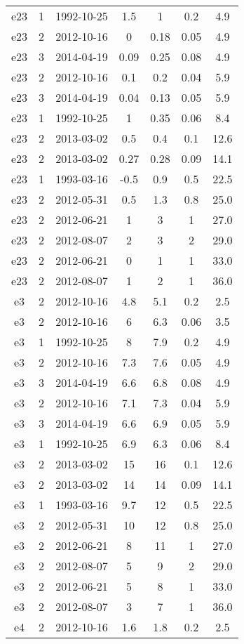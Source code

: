 \begin{longtable}{ccccccc}
e23 & 1 & 1992-10-25 & 1.5 & 1 & 0.2 & 4.9 \\
e23 & 2 & 2012-10-16 & 0 & 0.18 & 0.05 & 4.9 \\
e23 & 3 & 2014-04-19 & 0.09 & 0.25 & 0.08 & 4.9 \\
e23 & 2 & 2012-10-16 & 0.1 & 0.2 & 0.04 & 5.9 \\
e23 & 3 & 2014-04-19 & 0.04 & 0.13 & 0.05 & 5.9 \\
e23 & 1 & 1992-10-25 & 1 & 0.35 & 0.06 & 8.4 \\
e23 & 2 & 2013-03-02 & 0.5 & 0.4 & 0.1 & 12.6 \\
e23 & 2 & 2013-03-02 & 0.27 & 0.28 & 0.09 & 14.1 \\
e23 & 1 & 1993-03-16 & -0.5 & 0.9 & 0.5 & 22.5 \\
e23 & 2 & 2012-05-31 & 0.5 & 1.3 & 0.8 & 25.0 \\
e23 & 2 & 2012-06-21 & 1 & 3 & 1 & 27.0 \\
e23 & 2 & 2012-08-07 & 2 & 3 & 2 & 29.0 \\
e23 & 2 & 2012-06-21 & 0 & 1 & 1 & 33.0 \\
e23 & 2 & 2012-08-07 & 1 & 2 & 1 & 36.0 \\
e3 & 2 & 2012-10-16 & 4.8 & 5.1 & 0.2 & 2.5 \\
e3 & 2 & 2012-10-16 & 6 & 6.3 & 0.06 & 3.5 \\
e3 & 1 & 1992-10-25 & 8 & 7.9 & 0.2 & 4.9 \\
e3 & 2 & 2012-10-16 & 7.3 & 7.6 & 0.05 & 4.9 \\
e3 & 3 & 2014-04-19 & 6.6 & 6.8 & 0.08 & 4.9 \\
e3 & 2 & 2012-10-16 & 7.1 & 7.3 & 0.04 & 5.9 \\
e3 & 3 & 2014-04-19 & 6.6 & 6.9 & 0.05 & 5.9 \\
e3 & 1 & 1992-10-25 & 6.9 & 6.3 & 0.06 & 8.4 \\
e3 & 2 & 2013-03-02 & 15 & 16 & 0.1 & 12.6 \\
e3 & 2 & 2013-03-02 & 14 & 14 & 0.09 & 14.1 \\
e3 & 1 & 1993-03-16 & 9.7 & 12 & 0.5 & 22.5 \\
e3 & 2 & 2012-05-31 & 10 & 12 & 0.8 & 25.0 \\
e3 & 2 & 2012-06-21 & 8 & 11 & 1 & 27.0 \\
e3 & 2 & 2012-08-07 & 5 & 9 & 2 & 29.0 \\
e3 & 2 & 2012-06-21 & 5 & 8 & 1 & 33.0 \\
e3 & 2 & 2012-08-07 & 3 & 7 & 1 & 36.0 \\
e4 & 2 & 2012-10-16 & 1.6 & 1.8 & 0.2 & 2.5 \\

\end{longtable}
